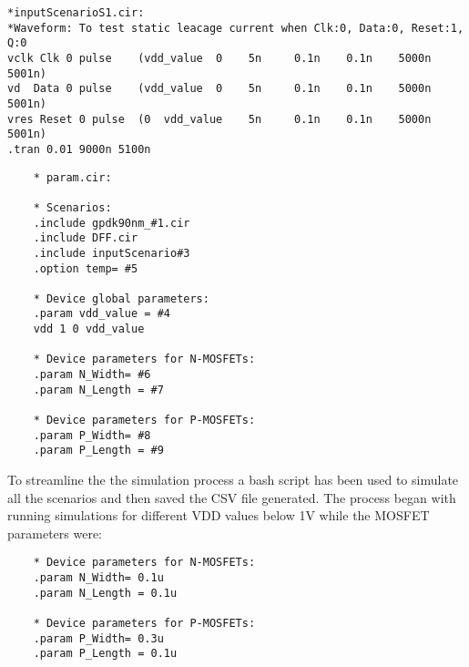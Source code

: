 \begin{lstlisting}
*inputScenarioS1.cir:
*Waveform: To test static leacage current when Clk:0, Data:0, Reset:1, Q:0
vclk Clk 0 pulse    (vdd_value  0    5n     0.1n    0.1n    5000n     5001n)     
vd  Data 0 pulse    (vdd_value  0    5n     0.1n    0.1n    5000n     5001n)   
vres Reset 0 pulse  (0  vdd_value    5n     0.1n    0.1n    5000n     5001n)   
.tran 0.01 9000n 5100n
\end{lstlisting}

\begin{lstlisting}
    * param.cir:
    
    * Scenarios:
    .include gpdk90nm_#1.cir 
    .include DFF.cir
    .include inputScenario#3
    .option temp= #5
    
    * Device global parameters:
    .param vdd_value = #4
    vdd 1 0 vdd_value
    
    * Device parameters for N-MOSFETs:
    .param N_Width= #6
    .param N_Length = #7
    
    * Device parameters for P-MOSFETs:
    .param P_Width= #8
    .param P_Length = #9
    \end{lstlisting}
    
    To streamline the the simulation process a bash script has been used to simulate all the scenarios and then saved the CSV file generated. The process began with running simulations for different VDD values below 1V while the MOSFET parameters were:
    
    \begin{lstlisting}
    * Device parameters for N-MOSFETs:
    .param N_Width= 0.1u
    .param N_Length = 0.1u
    
    * Device parameters for P-MOSFETs:
    .param P_Width= 0.3u
    .param P_Length = 0.1u
    \end{lstlisting}